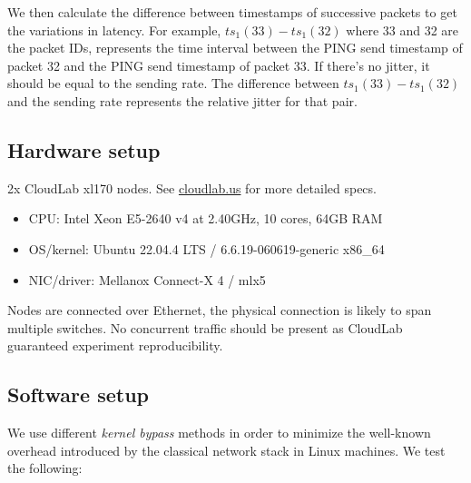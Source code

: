 \documentclass{article}
\begin{document}
We then calculate the difference between timestamps of successive packets
to get the variations in latency. For example, $ts_1(33) - ts_1(32)$ where 33 and
32 are the packet IDs, represents the time interval between the PING send timestamp
of packet 32 and the PING send timestamp of packet 33. If there's no jitter,
it should be equal to the sending rate. The difference between $ts_1(33) - ts_1(32)$
and the sending rate represents the relative jitter for that pair. 

\subsection{Hardware setup}
2x CloudLab xl170 nodes. See \href{cloudlab.us}{cloudlab.us}
for more detailed specs.

\begin{itemize}
  \itemsep=-0.8mm
  \item CPU:  Intel Xeon E5-2640 v4 at 2.40GHz, 10 cores, 64GB RAM
  \item OS/kernel: Ubuntu 22.04.4 LTS / 6.6.19-060619-generic x86\_64
  \item NIC/driver: Mellanox Connect-X 4 / mlx5 
\end{itemize}




Nodes are connected over Ethernet, the physical connection is likely to span multiple
switches. No concurrent traffic should be present as CloudLab guaranteed 
experiment reproducibility.

\subsection{Software setup}
\label{sec:software}
We use different \textit{kernel bypass} methods in order to minimize the 
well-known overhead introduced by the classical network stack in Linux machines.
We test the following: 
\end{document}
